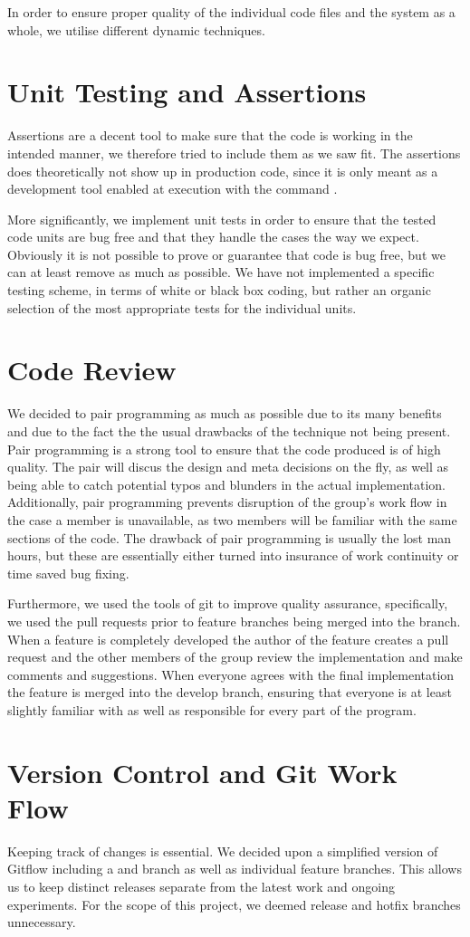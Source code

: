 In order to ensure proper quality of the individual code files and the system as a whole, we utilise different dynamic techniques.

\section{Unit Testing and Assertions}
Assertions are a decent tool to make sure that the code is working in the intended manner, we therefore tried to include them as we saw fit. The assertions does theoretically not show up in production code, since it is only meant as a development tool enabled at execution with the command .

More significantly, we implement unit tests in order to ensure that the tested code units are bug free and that they handle the cases the way we expect. Obviously it is not possible to prove or guarantee that code is bug free, but we can at least remove as much as possible. We have not implemented a specific testing scheme, in terms of white or black box coding, but rather an organic selection of the most appropriate tests for the individual units.

\section{Code Review}
We decided to pair programming as much as possible due to its many benefits and due to the fact the the usual drawbacks of the technique not being present.
Pair programming is a strong tool to ensure that the code produced is of high quality. The pair will discus the design and meta decisions on the fly, as well as being able to catch potential typos and blunders in the actual implementation. Additionally, pair programming prevents disruption of the group's work flow in the case a member is unavailable, as two members will be familiar with the same sections of the code. The drawback of pair programming is usually the lost man hours, but these are essentially either turned into insurance of work continuity or time saved bug fixing.

Furthermore, we used the tools of git to improve quality assurance, specifically, we used the pull requests prior to feature branches being merged into the  branch. When a feature is completely developed the author of the feature creates a pull request and the other members of the group review the implementation and make comments and suggestions. When everyone agrees with the final implementation the feature is merged into the develop branch, ensuring that everyone is at least slightly familiar with as well as responsible for every part of the program.

\section{Version Control and Git Work Flow}
Keeping track of changes is essential. We decided upon a simplified version of Gitflow including a  and  branch as well as individual feature branches. This allows us to keep distinct releases separate from the latest work and ongoing experiments. For the scope of this project, we deemed release and hotfix branches unnecessary.
